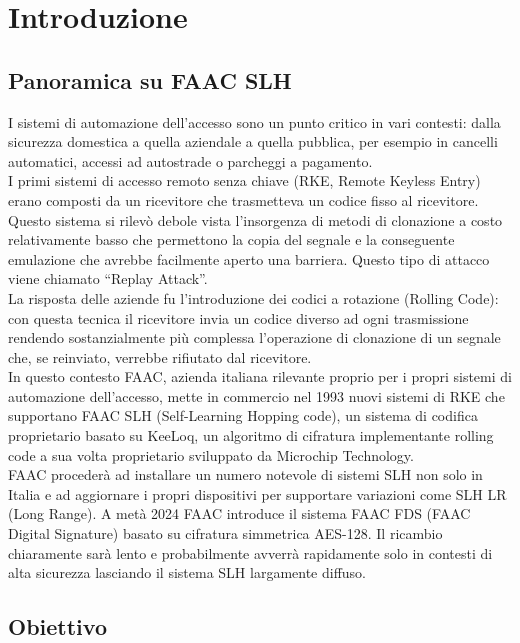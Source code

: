 \chapter{Introduzione}
\label{cha:intro}

\section{Panoramica su FAAC SLH}
\label{sec:overview}

I sistemi di automazione dell’accesso sono un punto critico in vari contesti: dalla sicurezza domestica a quella aziendale a quella pubblica, per esempio in cancelli automatici, accessi ad autostrade o parcheggi a pagamento.\\
I primi sistemi di accesso remoto senza chiave (RKE, Remote Keyless Entry) erano composti da un ricevitore che trasmetteva un codice fisso al ricevitore. Questo sistema si rilevò debole vista l’insorgenza di metodi di clonazione a costo relativamente basso che permettono la copia del segnale e la conseguente emulazione che avrebbe facilmente aperto una barriera. Questo tipo di attacco viene chiamato “Replay Attack”.\\
La risposta delle aziende fu l’introduzione dei codici a rotazione (Rolling Code): con questa tecnica il ricevitore invia un codice diverso ad ogni trasmissione rendendo sostanzialmente più complessa l’operazione di clonazione di un segnale che, se reinviato, verrebbe rifiutato dal ricevitore.\\
In questo contesto FAAC, azienda italiana rilevante proprio per i propri sistemi di automazione dell’accesso, mette in commercio nel 1993 nuovi sistemi di RKE che supportano FAAC SLH (Self-Learning Hopping code), un sistema di codifica proprietario basato su KeeLoq, un algoritmo di cifratura implementante rolling code a sua volta proprietario sviluppato da Microchip Technology.\\
FAAC procederà ad installare un numero notevole di sistemi SLH non solo in Italia e ad aggiornare i propri dispositivi per supportare variazioni come SLH LR (Long Range). A metà 2024 FAAC introduce il sistema FAAC FDS (FAAC Digital Signature) basato su cifratura simmetrica AES-128. Il ricambio chiaramente sarà lento e probabilmente avverrà rapidamente solo in contesti di alta sicurezza lasciando il sistema SLH largamente diffuso.\\

\section{Obiettivo}
\label{sec:obj}

